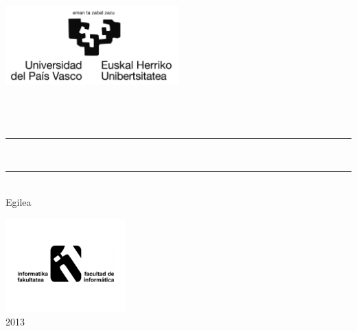\thispagestyle{empty}

\newcommand{\HRule}{\rule{\linewidth}{0.5mm}} 

\begin{center}
  \includegraphics[width=0.5\textwidth]{template/figs/ehu-logo-osoa.jpg} \\[1.3cm]
   {\Large \gradua}\\
   {\espezialitatea}\\[1.5cm]

  {\large {\gapizenburua}}\\[0.2cm]
\HRule \\[0.5cm]

{ \LARGE 
\begin{spacing}{1}
  \textbf{\izenburua}
\end{spacing}
}
 \vspace{0.5cm}
\HRule \\[2.0cm]

{ Egilea\\}
{\Large \textsl{\egilea}}
\vspace{2.0 cm} 

\includegraphics[width=0.35\textwidth]{template/figs/logo_infor.pdf} \\[0.1cm]
{\large \textsf{2013}}

\end{center}

